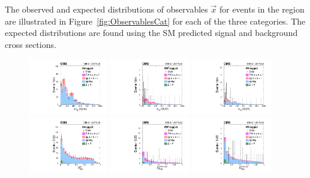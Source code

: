 The observed and expected distributions of observables $\vec{x}$ for events in the \offshell region are illustrated in Figure~\ref{fig:ObservablesCat} for each of the three categories. The expected distributions are found using the SM predicted signal and background cross sections.

\begin{figure}[!hbt]
\centering
\includegraphics[width=0.31\textwidth]{figures/Figure_005-a.pdf}
\includegraphics[width=0.31\textwidth]{figures/Figure_005-b.pdf}
\includegraphics[width=0.31\textwidth]{figures/Figure_005-c.pdf}\\ 
\includegraphics[width=0.31\textwidth]{figures/Figure_005-d.pdf}
\includegraphics[width=0.31\textwidth]{figures/Figure_005-e.pdf} 
\includegraphics[width=0.31\textwidth]{figures/Figure_005-f.pdf}\\ 

\end{figure}
